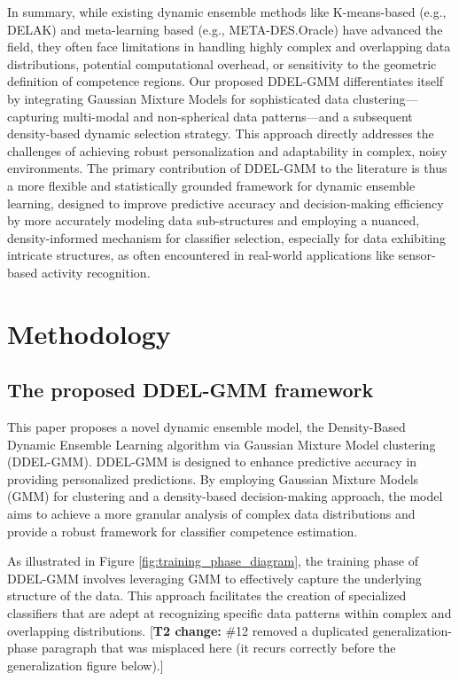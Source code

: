 \documentclass[lettersize,journal]{IEEEtran}
\newcommand{\greenhighlight}[1]{\textcolor{highlightgreen}{#1}}
\newcommand{\tnote}[1]{\textcolor{tier2note}{\footnotesize[\textbf{T2 change:} #1]}}
\begin{document}
\greenhighlight{In summary, while existing dynamic ensemble methods like K-means-based (e.g., DELAK) and meta-learning based (e.g., META-DES.Oracle) have advanced the field, they often face limitations in handling highly complex and overlapping data distributions, potential computational overhead, or sensitivity to the geometric definition of competence regions. Our proposed DDEL-GMM differentiates itself by integrating Gaussian Mixture Models for sophisticated data clustering—capturing multi-modal and non-spherical data patterns—and a subsequent density-based dynamic selection strategy. This approach directly addresses the challenges of achieving robust personalization and adaptability in complex, noisy environments. The primary contribution of DDEL-GMM to the literature is thus a more flexible and statistically grounded framework for dynamic ensemble learning, designed to improve predictive accuracy and decision-making efficiency by more accurately modeling data sub-structures and employing a nuanced, density-informed mechanism for classifier selection, especially for data exhibiting intricate structures, as often encountered in real-world applications like sensor-based activity recognition.}
	\section{Methodology}
	
	\subsection{The proposed DDEL-GMM framework}
	
	\noindent This paper proposes a novel dynamic ensemble model, the Density-Based Dynamic Ensemble Learning algorithm via Gaussian Mixture Model clustering (DDEL-GMM). \greenhighlight{DDEL-GMM is designed to enhance predictive accuracy in providing personalized predictions.} By employing Gaussian Mixture Models (GMM) for clustering and a density-based decision-making approach, \greenhighlight{the model aims to achieve} a more granular analysis of complex data distributions and \greenhighlight{provide} a robust framework for classifier competence estimation.
	
	As illustrated in Figure \ref{fig:training_phase_diagram}, the training phase of \greenhighlight{DDEL-GMM} involves leveraging GMM to effectively capture the underlying structure of the data. This approach facilitates the creation of specialized classifiers that are adept at recognizing specific data patterns within complex and overlapping distributions.
	\tnote{\#12 removed a duplicated generalization-phase paragraph that was misplaced here (it recurs correctly before the generalization figure below).}
	
\end{document}
